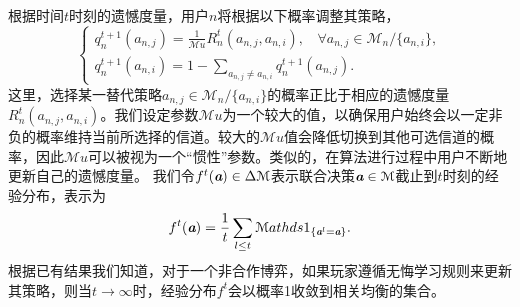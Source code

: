 根据时间$t$时刻的遗憾度量，用户$n$将根据以下概率调整其策略，
\vspace{-0.3cm}
\begin{equation}\label{eq:st1}
\begin{cases}
q^{t+1}_n(a_{n,j})=\frac{1}{\mathcal{M}u}R^t_n(a_{n,j},a_{n,i}), ~~~~\forall a_{n,j}\in\mathcal{M}_n/\{a_{n,i}\}, \\
q^{t+1}_n(a_{n,i})=1-\sum_{a_{n,j}\neq a_{n,i}}q^{t+1}_n(a_{n,j}).
\end{cases}
\end{equation}
这里，选择某一替代策略$a_{n,j}\in\mathcal{M}_n/\{a_{n,i}\}$的概率正比于相应的遗憾度量$R^{t}_n(a_{n,j},a_{n,i})$。我们设定参数$\mathcal{M}u$为一个较大的值，以确保用户始终会以一定非负的概率维持当前所选择的信道。较大的$\mathcal{M}u$值会降低切换到其他可选信道的概率，因此$\mathcal{M}u$可以被视为一个“惯性”参数。类似的，在算法进行过程中用户不断地更新自己的遗憾度量。
我们令$f^t(\emph{\textbf{a}})\in\Delta\mathcal{M}$表示联合决策$\emph{\textbf{a}}\in\mathcal{M}$截止到$t$时刻的经验分布，表示为
\vspace{-0.2cm}
\begin{equation}\label{eq:empi}
f^t(\emph{\textbf{a}})=\frac{1}{t}\sum_{l\leq t}\mathcal{M}athds{1}_{\{\emph{\textbf{a}}^l=\emph{\textbf{a}}\}}.
\end{equation}
根据已有结果我们知道，对于一个非合作博弈，如果玩家遵循无悔学习规则来更新其策略，则当$t\rightarrow\infty$时，经验分布$f^t$会以概率1收敛到相关均衡的集合\cite{Hart00asimple}。

